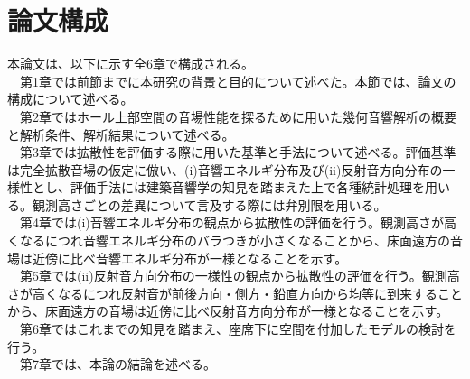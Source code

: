 \section{論文構成}
本論文は、以下に示す全6章で構成される。
\\　第1章では前節までに本研究の背景と目的について述べた。本節では、論文の構成について述べる。
\\　第2章ではホール上部空間の音場性能を探るために用いた幾何音響解析の概要と解析条件、解析結果について述べる。
\\　第3章では拡散性を評価する際に用いた基準と手法について述べる。評価基準は完全拡散音場の仮定に倣い、(i)音響エネルギ分布及び(ii)反射音方向分布の一様性とし、評価手法には建築音響学の知見を踏まえた上で各種統計処理を用いる。観測高さごとの差異について言及する際には弁別限を用いる。
\\　第4章では(i)音響エネルギ分布の観点から拡散性の評価を行う。観測高さが高くなるにつれ音響エネルギ分布のバラつきが小さくなることから、床面遠方の音場は近傍に比べ音響エネルギ分布が一様となることを示す。
\\　第5章では(ii)反射音方向分布の一様性の観点から拡散性の評価を行う。観測高さが高くなるにつれ反射音が前後方向・側方・鉛直方向から均等に到来することから、床面遠方の音場は近傍に比べ反射音方向分布が一様となることを示す。
\\　第6章ではこれまでの知見を踏まえ、座席下に空間を付加したモデルの検討を行う。
\\　第7章では、本論の結論を述べる。